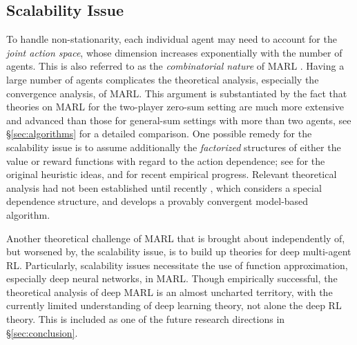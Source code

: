 \subsection{Scalability Issue}\label{subsec:scala_issue}
To handle non-stationarity, each individual agent may need to account for the \emph{joint action space},  whose dimension  increases exponentially with the number of agents. This is also referred to as the \emph{combinatorial nature} of MARL \cite{hernandez2018multiagent}. Having a large  number of agents complicates the theoretical analysis, especially the convergence analysis, of MARL. This argument is   substantiated by the fact that  theories on  MARL for the two-player zero-sum setting are much more extensive and advanced than those for general-sum settings with more than two agents, see \S\ref{sec:algorithms} for a detailed comparison.  
One possible remedy for the scalability issue is to assume additionally the \emph{factorized}  structures of either the value or reward functions with regard to the action dependence; see  \cite{guestrin2002coordinated,guestrin2002multiagent,kok2004sparse} for the original heuristic ideas, and \cite{sunehag2018value,rashid2018qmix} for recent empirical progress. Relevant theoretical analysis had  not  been established until recently \cite{qu2019exploiting}, which considers a special dependence structure, and develops a provably convergent model-based  algorithm. 

Another  theoretical challenge of MARL that is brought about independently  of, but worsened by, the scalability issue,   is to build up theories for deep multi-agent RL. 
Particularly, scalability issues 
 necessitate the use of function approximation, especially  deep  neural networks,   in MARL. Though  empirically successful,  the theoretical analysis of deep MARL is an almost uncharted territory, with the currently limited understanding of deep 
learning theory, not alone the deep RL theory.  This is included as one of the future research directions in \S\ref{sec:conclusion}. 



